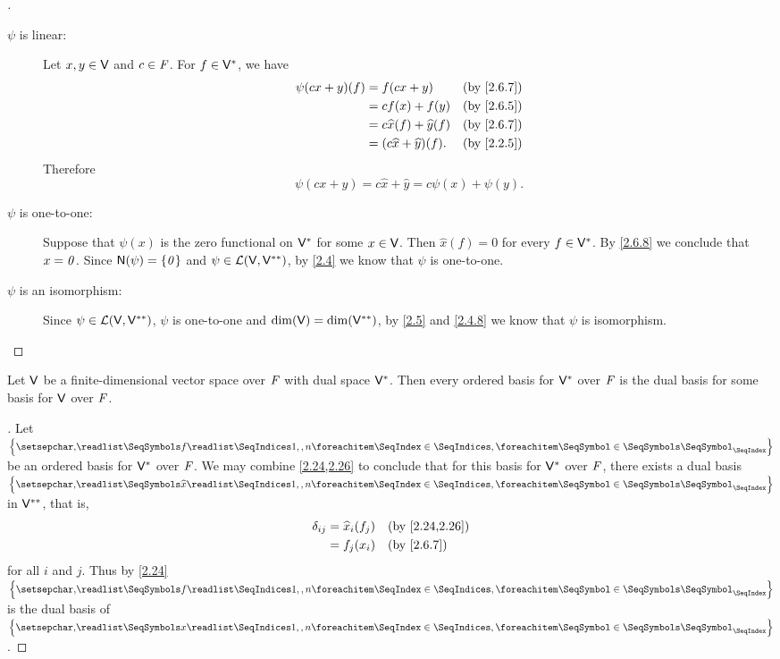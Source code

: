 \begin{proof}[]
	\begin{description}
		\item[\(\psi\) is linear:]
			Let \(x, y \in \mathsf{V}\) and \(c \in \mathit{F}\).
			For \(f \in \mathsf{V}^*\), we have
			\begin{align*}
				\psi(cx + y)(f) & = f(cx + y)                         &  & \by{2.6.7} \\
				                & = cf(x) + f(y)                      &  & \by{2.6.5} \\
				                & = c \widehat{x}(f) + \widehat{y}(f) &  & \by{2.6.7} \\
				                & = (c \widehat{x} + \widehat{y})(f). &  & \by{2.2.5}
			\end{align*}
			Therefore
			\[
				\psi(cx + y) = c \widehat{x} + \widehat{y} = c \psi(x) + \psi(y).
			\]
		\item[\(\psi\) is one-to-one:]
			Suppose that \(\psi(x)\) is the zero functional on \(\mathsf{V}^*\) for some \(x \in \mathsf{V}\).
			Then \(\widehat{x}(f) = 0\) for every \(f \in \mathsf{V}^*\).
			By \cref{2.6.8} we conclude that \(x = \mathit{0}\).
			Since \(\ns{\psi} = \set{\zv}\) and \(\psi \in \mathcal{L}(\mathsf{V}, \mathsf{V}^{**})\), by \cref{2.4} we know that \(\psi\) is one-to-one.
		\item[\(\psi\) is an isomorphism:]
			Since \(\psi \in \mathcal{L}(\mathsf{V}, \mathsf{V}^{**})\), \(\psi\) is one-to-one and \(\dim(\mathsf{V}) = \dim(\mathsf{V}^{**})\), by \cref{2.5} and \cref{2.4.8} we know that \(\psi\) is isomorphism.
	\end{description}
\end{proof}

\begin{cor}\label{2.6.9}
	Let \(\mathsf{V}\) be a finite-dimensional vector space over \(\mathit{F}\) with dual space \(\mathsf{V}^*\).
	Then every ordered basis for \(\mathsf{V}^*\) over \(\mathit{F}\) is the dual basis for some basis for \(\mathsf{V}\) over \(\mathit{F}\).
\end{cor}

\begin{proof}[]
	Let \(\set{\seq{f}{1,,n}}\) be an ordered basis for \(\mathsf{V}^*\) over \(\mathit{F}\).
	We may combine \cref{2.24,2.26} to conclude that for this basis for \(\mathsf{V}^*\) over \(\mathit{F}\), there exists a dual basis \(\set{\seq{\widehat{x}}{1,,n}}\) in \(\mathsf{V}^{**}\), that is,
	\begin{align*}
		\delta_{i j} & = \widehat{x}_i(f_j) &  & \by{2.24,2.26} \\
		             & = f_j(x_i)           &  & \by{2.6.7}
	\end{align*}
	for all \(i\) and \(j\).
	Thus by \cref{2.24} \(\set{\seq{f}{1,,n}}\) is the dual basis of \(\set{\seq{x}{1,,n}}\).
\end{proof}

